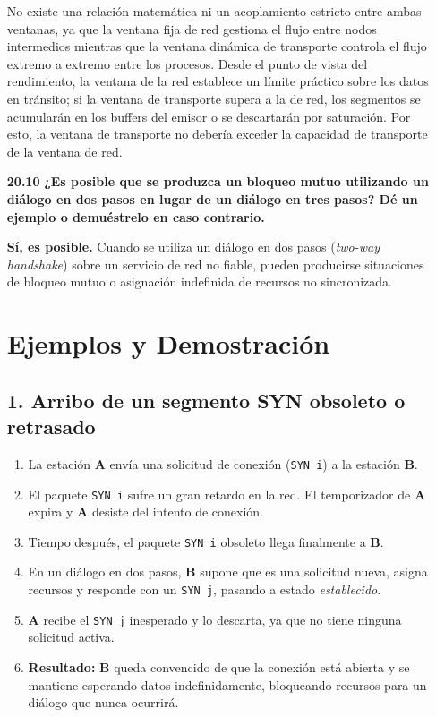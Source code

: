 \documentclass[11pt,a4paper]{article}
\begin{document}
\begin{enumerate}
    No existe una relación matemática ni un acoplamiento estricto entre ambas ventanas, ya que la ventana fija de red gestiona el flujo entre nodos intermedios mientras que la ventana dinámica de transporte controla el flujo extremo a extremo entre los procesos. Desde el punto de vista del rendimiento, la ventana de la red establece un límite práctico sobre los datos en tránsito; si la ventana de transporte supera a la de red, los segmentos se acumularán en los buffers del emisor o se descartarán por saturación. Por esto, la ventana de transporte no debería exceder la capacidad de transporte de la ventana de red.

    \item[\textbf{20.10}] \textbf{¿Es posible que se produzca un bloqueo mutuo utilizando un diálogo en dos pasos en lugar de un diálogo en tres pasos? Dé un ejemplo o demuéstrelo en caso contrario.}

    \textbf{Sí, es posible.} Cuando se utiliza un diálogo en dos pasos (\textit{two-way handshake}) sobre un servicio de red no fiable, pueden producirse situaciones de bloqueo mutuo o asignación indefinida de recursos no sincronizada.

\section*{Ejemplos y Demostración}

\subsection*{1. Arribo de un segmento SYN obsoleto o retrasado}
\begin{enumerate}
    \item La estación \textbf{A} envía una solicitud de conexión (\texttt{SYN i}) a la estación \textbf{B}.
    \item El paquete \texttt{SYN i} sufre un gran retardo en la red. El temporizador de \textbf{A} expira y \textbf{A} desiste del intento de conexión.
    \item Tiempo después, el paquete \texttt{SYN i} obsoleto llega finalmente a \textbf{B}.
    \item En un diálogo en dos pasos, \textbf{B} supone que es una solicitud nueva, asigna recursos y responde con un \texttt{SYN j}, pasando a estado \textit{establecido}.
    \item \textbf{A} recibe el \texttt{SYN j} inesperado y lo descarta, ya que no tiene ninguna solicitud activa.
    \item \textbf{Resultado:} \textbf{B} queda convencido de que la conexión está abierta y se mantiene esperando datos indefinidamente, bloqueando recursos para un diálogo que nunca ocurrirá.
\end{enumerate}


\end{enumerate}
\end{document}
